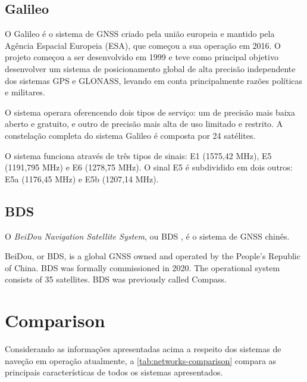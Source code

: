 \subsection{Galileo}

O Galileo é o sistema de GNSS criado pela união europeia e mantido pela Agência Espacial Europeia (ESA), que começou a sua operação em 2016. O projeto começou a ser desenvolvido em 1999 e teve como principal objetivo desenvolver um sistema de posicionamento global de alta precisão independente dos sistemas GPS e GLONASS, levando em conta principalmente razões políticas e militares.

O sistema operara oferencendo dois tipos de serviço: um de precisão mais baixa aberto e gratuito, e outro de precisão mais alta de uso limitado e restrito. A constelação completa do sistema Galileo é composta por 24 satélites.

O sistema funciona através de três tipos de sinais: E1 (1575,42 MHz), E5 (1191,795 MHz) e E6 (1278,75 MHz). O sinal E5 é subdividido em dois outros: E5a (1176,45 MHz) e E5b (1207,14 MHz).

\subsection{BDS}

O \textit{BeiDou Navigation Satellite System}, ou BDS \cite{beidou}, é o sistema de GNSS chinês.

BeiDou, or BDS, is a global GNSS owned and operated by the People's Republic of China. BDS was formally commissioned in 2020. The operational system consists of 35 satellites. BDS was previously called Compass.


\section{Comparison}

Considerando as informações apresentadas acima a respeito dos sistemas de naveção em operação atualmente, a \autoref{tab:networks-comparison} compara as principais características de todos os sistemas apresentados.


